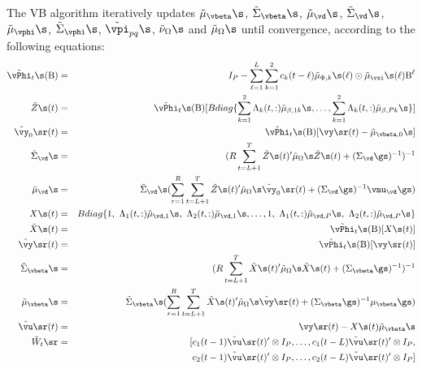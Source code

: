The VB algorithm iteratively updates $\tilde{\mu}_{\vbeta}\s$, $\tilde{\Sigma}_{\vbeta}\s$, $\tilde{\mu}_{\vd}\s$, $\tilde{\Sigma}_{\vd}\s$, $\tilde{\mu}_{\vphi}\s$, $\tilde{\Sigma}_{\vphi}\s$, $\tilde{\vpi}_{pq}\s$, $\tilde{\nu}_{\Omega}\s$ and $\tilde{\mu}_{\Omega}\s$ until convergence, according to the following equations: 
\begin{eqnarray*}
\tilde{\vPhi}_t\s(\text{B}) &=& I_P - \sum_{\ell=1}^L\sum_{k=1}^2 c_k(t-\ell)\tilde{\mu}_{\Phi,k}\s(\ell)\odot \tilde{\mu}_{\vxi}\s(\ell)\text{B}^{\ell}\\ 
\tilde{Z}\s(t)&=& \tilde{\vPhi}_t\s(\text{B})[Bdiag\{\sum_{k=1}^2\Lambda_k(t,:)\tilde{\mu}_{\beta,1k}\s, \dots, \sum_{k=1}^2\Lambda_k(t,:)\tilde{\mu}_{\beta,Pk}\s\}]\\
\tilde{\vy}_0\sr(t) & = & \tilde{\vPhi}_t\s(\text{B})[\vy\sr(t) - \tilde{\mu}_{\vbeta,0}\s]\\
\tilde{\Sigma}_{\vd}\s&=& (R\sum_{t=L+1}^{T}\tilde{Z}\s(t)'\tilde{\mu}_{\Omega}\s\tilde{Z}\s(t)+(\Sigma_{\vd}\gs)^{-1})^{-1} \\
\tilde{\mu}_{\vd}\s &=& \tilde{\Sigma}_{\vd}\s(\sum_{r=1}^{R}\sum_{t=L+1}^{T}\tilde{Z}\s(t)'\tilde{\mu}_{\Omega}\s\tilde{\vy}_0\sr(t)+(\Sigma_{\vd}\gs)^{-1}\vmu_{\vd}\gs)\\
X\s(t)&=& Bdiag\{1,~\Lambda_1(t,:)\tilde{\mu}_{\vd,1}\s, ~\Lambda_2(t,:)\tilde{\mu}_{\vd,1}\s, \dots, 1,~\Lambda_1(t,:)\tilde{\mu}_{\vd,P}\s, ~\Lambda_2(t,:)\tilde{\mu}_{\vd,P}\s\}\\
\tilde{X}\s(t)&=& \tilde{\vPhi}_t\s(\text{B})[X\s(t)]\\
\tilde{\vy}\sr(t) & = & \tilde{\vPhi}_t\s(\text{B})[\vy\sr(t)]\\
\tilde{\Sigma}_{\vbeta}\s &=& (R\sum_{t=L+1}^{T}\tilde{X}\s(t)'\tilde{\mu}_{\Omega}\s\tilde{X}\s(t)+(\Sigma_{\vbeta}\gs)^{-1})^{-1} \\
\tilde{\mu}_{\vbeta}\s &=& \tilde{\Sigma}_{\vbeta}\s(\sum_{r=1}^{R}\sum_{t=L+1}^{T}\tilde{X}\s(t)'\tilde{\mu}_{\Omega}\s\tilde{\vy}\sr(t)+(\Sigma_{\vbeta}\gs)^{-1}\mu_{\vbeta}\gs)\\
\tilde{\vu}\sr(t)&=& \vy\sr(t) - X\s(t)\tilde{\mu}_{\vbeta}\s\\
\tilde{W}_t\sr &=& [c_1(t-1)\tilde{\vu}\sr(t)'\otimes I_P, \dots,  c_1(t-L)\tilde{\vu}\sr(t)'\otimes I_P, \\
&& c_2(t-1)\tilde{\vu}\sr(t)'\otimes I_P, \dots,  c_2(t-L)\tilde{\vu}\sr(t)'\otimes I_P]\\

\end{eqnarray*}
